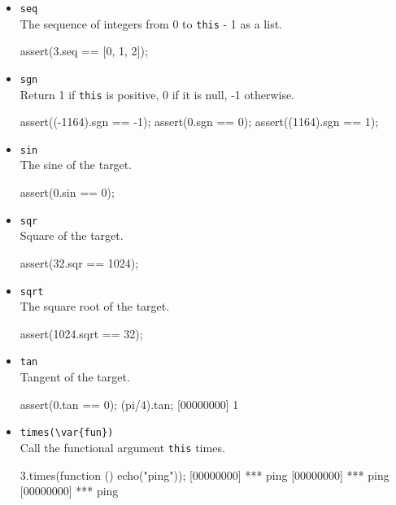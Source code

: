 \begin{itemize}
\item \lstinline|seq|\\
  The sequence of integers from 0 to \lstinline|this| - 1 as a list.
\begin{urbiscript}[firstnumber=last]
assert(3.seq == [0, 1, 2]);
\end{urbiscript}

\item \lstinline|sgn|\\
  Return 1 if \lstinline|this| is positive, 0 if it is null, -1
  otherwise.
\begin{urbiscript}[firstnumber=last]
assert((-1164).sgn == -1);
assert(0.sgn       == 0);
assert((1164).sgn  == 1);
\end{urbiscript}

\item \lstinline|sin|\\
  The sine of the target.
\begin{urbiscript}[firstnumber=last]
assert(0.sin == 0);
\end{urbiscript}

\item \lstinline|sqr|\\
  Square of the target.
\begin{urbiscript}[firstnumber=last]
assert(32.sqr == 1024);
\end{urbiscript}

\item \lstinline|sqrt|\\
  The square root of the target.
\begin{urbiscript}[firstnumber=last]
assert(1024.sqrt == 32);
\end{urbiscript}

\item \lstinline|tan|\\
  Tangent of the target.
\begin{urbiscript}[firstnumber=last]
assert(0.tan == 0);
(pi/4).tan;
[00000000] 1
\end{urbiscript}

\item \lstinline|times(\var{fun})|\\
  Call the functional argument  \lstinline|this| times.

\begin{urbiscript}[firstnumber=last]
3.times(function () { echo("ping")});
[00000000] *** ping
[00000000] *** ping
[00000000] *** ping
\end{urbiscript}


\end{itemize}

